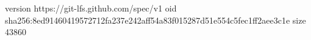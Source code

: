 version https://git-lfs.github.com/spec/v1
oid sha256:8ed91460419572712fa237e242aff54a83f015287d51e554c5fec1ff2aee3c1e
size 43860
